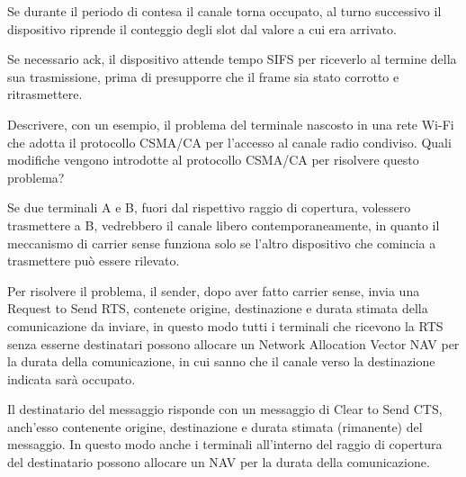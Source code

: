 \begin{questions}
\begin{solution}
        Se durante il periodo di contesa il canale torna occupato, al turno successivo il dispositivo riprende il conteggio degli slot dal valore a cui era arrivato.
        
        Se necessario ack, il dispositivo attende tempo SIFS per riceverlo al termine della sua trasmissione, prima di presupporre che il frame sia stato corrotto e ritrasmettere.
    \end{solution}
    
    \question Descrivere, con un esempio, il problema del terminale nascosto in una rete Wi-Fi che adotta il protocollo CSMA/CA per l'accesso al canale radio condiviso. Quali modifiche vengono introdotte al protocollo CSMA/CA per risolvere questo problema? 
    
    \begin{solution}
        Se due terminali A e B, fuori dal rispettivo raggio di copertura, volessero trasmettere a B, vedrebbero il canale libero contemporaneamente, in quanto il meccanismo di carrier sense funziona solo se l'altro dispositivo che comincia a trasmettere può essere rilevato.
        
        Per risolvere il problema, il sender, dopo aver fatto carrier sense, invia una Request to Send RTS, contenete origine, destinazione e durata stimata della comunicazione da inviare, in questo modo tutti i terminali che ricevono la RTS senza esserne destinatari possono allocare un Network Allocation Vector NAV per la durata della comunicazione, in cui sanno che il canale verso la destinazione indicata sarà occupato.
        
        Il destinatario del messaggio risponde con un messaggio di Clear to Send CTS, anch'esso contenente origine, destinazione e durata stimata (rimanente) del messaggio. In questo modo anche i terminali all'interno del raggio di copertura del destinatario possono allocare un NAV per la durata della comunicazione.
    \end{solution}
\end{questions}